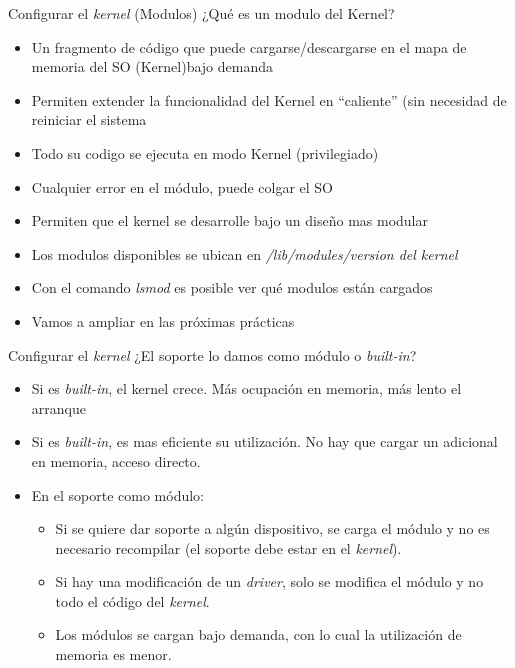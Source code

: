 \begin{frame}{Configurar el \textit{kernel} (Modulos)}
¿Qué es un modulo del Kernel?
\begin{itemize}
\item Un fragmento de código que puede cargarse/descargarse en el mapa de memoria del SO (Kernel)bajo demanda
\item Permiten extender la funcionalidad del Kernel en ``caliente'' (sin necesidad de reiniciar el sistema
\item Todo su codigo se ejecuta en modo Kernel (privilegiado)
\item Cualquier error en el módulo, puede colgar el SO
\item Permiten que el kernel se desarrolle bajo un diseño mas modular
\item Los modulos disponibles se ubican en \textit{/lib/modules/version del kernel}
\item Con el comando \textit{lsmod} es posible ver qué modulos están cargados
\item \alert{Vamos a ampliar en las próximas prácticas}
\end{itemize}
\end{frame}


\begin{frame}{Configurar el \textit{kernel}}
¿El soporte lo damos como módulo o \textit{built-in}?
\pause
\begin{itemize}
\item Si es \textit{built-in}, el kernel crece. Más ocupación en memoria, más lento el arranque
\item Si es \textit{built-in}, es mas eficiente su utilización. No hay que
  cargar un adicional en memoria, acceso directo.
\item En el soporte como módulo:
  \begin{itemize}
  \item Si se quiere dar soporte a algún dispositivo, se carga el módulo y
    no es necesario recompilar (el soporte debe estar en el
    \textit{kernel}).

  \item Si hay una modificación de un \textit{driver}, solo se modifica el
    módulo y no todo el código del \textit{kernel}.

  \item Los módulos se cargan bajo demanda, con lo cual la utilización de
    memoria es menor.
  \end{itemize}
\end{itemize}
\end{frame}

